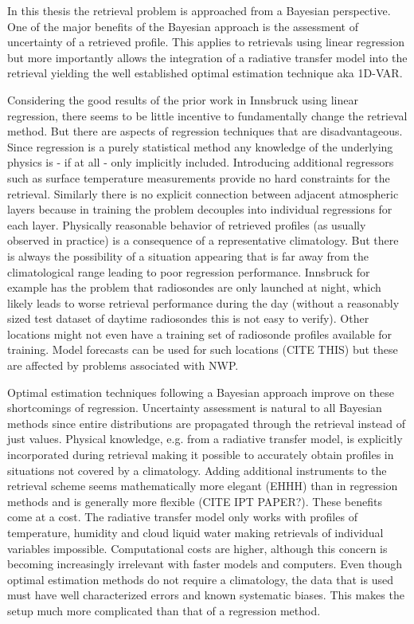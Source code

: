 \stopsection


\startsection[title={Objectives}]

    In this thesis the retrieval problem is approached from a Bayesian
    perspective. One of the major benefits of the Bayesian approach is the
    assessment of uncertainty of a retrieved profile. This applies to
    retrievals using linear regression but more importantly allows the
    integration of a radiative transfer model into the retrieval yielding
    the well established optimal estimation technique aka 1D-VAR.

    Considering the good results of the prior work in Innsbruck using linear
    regression, there seems to be little incentive to fundamentally change the
    retrieval method. But there are aspects of regression techniques that are
    disadvantageous. Since regression is a purely statistical method any
    knowledge of the underlying physics is - if at all - only implicitly
    included. Introducing additional regressors such as surface temperature
    measurements provide no hard constraints for the retrieval. Similarly
    there is no explicit connection between adjacent atmospheric layers because
    in training the problem decouples into individual regressions for each
    layer. Physically reasonable behavior of retrieved profiles (as usually
    observed in practice) is a consequence of a representative climatology.
    But there is always the possibility of a situation appearing that is far
    away from the climatological range leading to poor regression performance.
    Innsbruck for example has the problem that radiosondes are only launched at
    night, which likely leads to worse retrieval performance during the day
    (without a reasonably sized test dataset of daytime radiosondes this is not
    easy to verify).  Other locations might not even have a training set of
    radiosonde profiles available for training. Model forecasts can be used for
    such locations (CITE THIS) but these are affected by problems associated
    with NWP.

    Optimal estimation techniques following a Bayesian approach improve on
    these shortcomings of regression. Uncertainty assessment is natural to all
    Bayesian methods since entire distributions are propagated through the
    retrieval instead of just values. Physical knowledge, e.g. from a radiative
    transfer model, is explicitly incorporated during retrieval making it
    possible to accurately obtain profiles in situations not covered by
    a climatology. Adding additional instruments to the retrieval scheme seems
    mathematically more elegant (EHHH) than in regression methods and is
    generally more flexible (CITE IPT PAPER?). These benefits come at a cost.
    The radiative transfer model only works with profiles of temperature,
    humidity and cloud liquid water making retrievals of individual variables
    impossible. Computational costs are higher, although this concern is
    becoming increasingly irrelevant with faster models and computers. Even
    though optimal estimation methods do not require a climatology, the data
    that is used must have well characterized errors and known systematic
    biases. This makes the setup much more complicated than that of
    a regression method.

